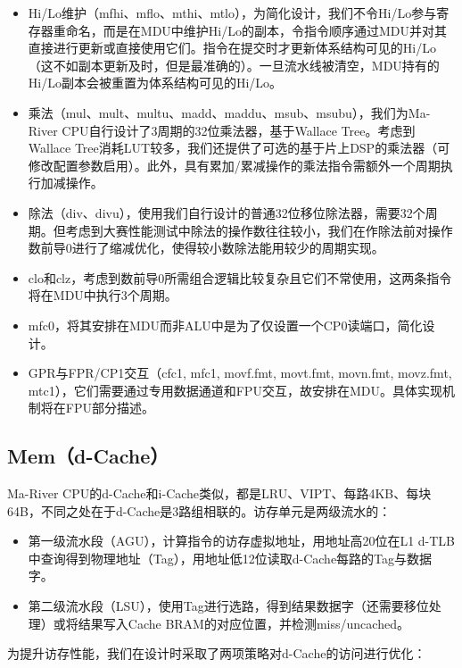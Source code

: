 \begin{itemize}
    \item Hi/Lo维护（mfhi、mflo、mthi、mtlo），为简化设计，我们不令Hi/Lo参与寄存器重命名，而是在MDU中维护Hi/Lo的副本，令指令顺序通过MDU并对其直接进行更新或直接使用它们。指令在提交时才更新体系结构可见的Hi/Lo（这不如副本更新及时，但是最准确的）。一旦流水线被清空，MDU持有的Hi/Lo副本会被重置为体系结构可见的Hi/Lo。
    \item 乘法（mul、mult、multu、madd、maddu、msub、msubu），我们为Ma-River CPU自行设计了3周期的32位乘法器，基于Wallace Tree。考虑到Wallace Tree消耗LUT较多，我们还提供了可选的基于片上DSP的乘法器（可修改配置参数启用）。此外，具有累加/累减操作的乘法指令需额外一个周期执行加减操作。
    \item 除法（div、divu），使用我们自行设计的普通32位移位除法器，需要32个周期。但考虑到大赛性能测试中除法的操作数往往较小，我们在作除法前对操作数前导0进行了缩减优化，使得较小数除法能用较少的周期实现。
    \item clo和clz，考虑到数前导0所需组合逻辑比较复杂且它们不常使用，这两条指令将在MDU中执行3个周期。
    \item mfc0，将其安排在MDU而非ALU中是为了仅设置一个CP0读端口，简化设计。
    \item GPR与FPR/CP1交互（cfc1, mfc1, movf.fmt, movt.fmt, movn.fmt, movz.fmt, mtc1），它们需要通过专用数据通道和FPU交互，故安排在MDU。具体实现机制将在FPU部分描述。
\end{itemize}

\subsection{Mem（d-Cache）}

Ma-River CPU的d-Cache和i-Cache类似，都是LRU、VIPT、每路4KB、每块64B，不同之处在于d-Cache是3路组相联的。访存单元是两级流水的：

\begin{itemize}
    \item 第一级流水段（AGU），计算指令的访存虚拟地址，用地址高20位在L1 d-TLB中查询得到物理地址（Tag），用地址低12位读取d-Cache每路的Tag与数据字。
    \item 第二级流水段（LSU），使用Tag进行选路，得到结果数据字（还需要移位处理）或将结果写入Cache BRAM的对应位置，并检测miss/uncached。
\end{itemize}

为提升访存性能，我们在设计时采取了两项策略对d-Cache的访问进行优化：

